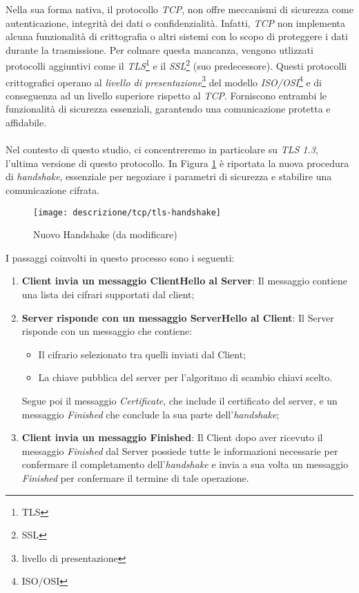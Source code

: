 \noindent Nella sua forma nativa, il protocollo \emph{TCP}, non offre meccanismi di sicurezza come autenticazione, integrità dei dati o confidenzialità. Infatti, \emph{TCP} non implementa alcuna funzionalità di crittografia o altri sistemi con lo scopo di proteggere i dati durante la trasmissione.
Per colmare questa mancanza, vengono utlizzati protocolli aggiuntivi come il \emph{TLS}\footnote{\gls{TLS}} e il \emph{SSL}\footnote{\gls{SSL}} (suo predecessore). Questi protocolli crittografici operano al \emph{livello di presentazione}\footnote{\gls{livello di presentazione}} del modello \emph{ISO/OSI}\footnote{\gls{ISO/OSI}} e di conseguenza ad un livello superiore rispetto al \emph{TCP}.
Forniscono entrambi le funzionalità di sicurezza essenziali, garantendo una comunicazione protetta e affidabile.
\\\\
Nel contesto di questo studio, ci concentreremo in particolare su \emph{TLS 1.3}, l'ultima versione di questo protocollo. In Figura \ref{tlsHand} è riportata la nuova procedura di \emph{handshake}, essenziale per negoziare i parametri di sicurezza e stabilire una comunicazione cifrata.
\begin{figure}[!h]
    \centering
    \texttt{[image: descrizione/tcp/tls-handshake]}
    \caption{Nuovo Handshake (da modificare)}
    \label{tlsHand}
\end{figure}

\noindent I passaggi coinvolti in questo processo sono i seguenti: 
\begin{enumerate}
    \item \textbf{Client invia un messaggio ClientHello al Server}: Il messaggio contiene una lista dei cifrari supportati dal client;
    \item \textbf{Server risponde con un messaggio ServerHello al Client}: Il Server risponde con un messaggio che contiene: 
    \begin{itemize}
        \item  Il cifrario selezionato tra quelli inviati dal Client;
        \item  La chiave pubblica del server per l'algoritmo di scambio chiavi scelto.
    \end{itemize}
    Segue poi il messaggio \emph{Certificate}, che include il certificato del server, e un messaggio \emph{Finished} che conclude la sua parte dell'\emph{handshake};
    \item \textbf{Client invia un messaggio Finished}: Il Client dopo aver ricevuto il messaggio \emph{Finished} dal Server possiede tutte le informazioni necessarie per confermare il completamento dell'\emph{handshake} e invia a sua volta un messaggio \emph{Finished} per confermare il termine di tale operazione.
\end{enumerate}

